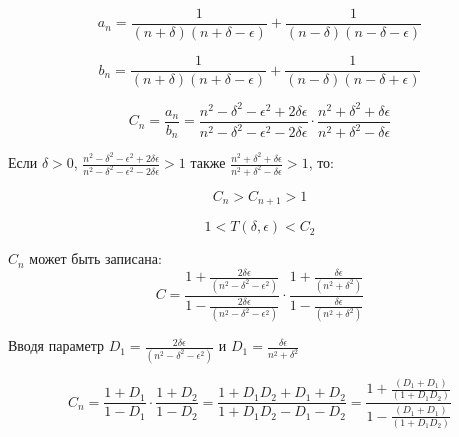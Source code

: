 \begin{equation}
\label{eq:equation103}
a_{n} = \frac{1}{(n + \delta)(n + \delta - \epsilon)} + \frac{1}{(n - \delta)(n - \delta - \epsilon)} 
\end{equation}

\begin{equation}
\label{eq:equation104}
b_{n} = \frac{1}{(n + \delta)(n + \delta - \epsilon)} + \frac{1}{(n - \delta)(n - \delta + \epsilon)} 
\end{equation}

\begin{equation}
\label{eq:equation105}
C_{n} = \frac{a_{n}}{b_{n}} = \frac{n^2 -\delta^2 - \epsilon^2 + 2\delta \epsilon}{n^2 -\delta^2 - \epsilon^2 - 2\delta \epsilon} \cdot \frac{n^2 + \delta^2 + \delta \epsilon}{n^2 + \delta^2 - \delta \epsilon}
\end{equation}

Если $\delta > 0$, $\frac{n^2 - \delta^2 - \epsilon^2 +2\delta \epsilon}{n^2 - \delta^2 - \epsilon^2 - 2\delta \epsilon} > 1$ также $\frac{n^2 + \delta^2 + \delta \epsilon}{n^2 + \delta^2 - \delta \epsilon} > 1$, то:

\begin{equation}
\label{eq:equation106}
C_{n} > C_{n + 1} > 1 
\end{equation}

\begin{equation}
\label{eq:equation107}
1 < T(\delta, \epsilon) < C_{2}
\end{equation} 

$C_{n}$ может быть записана:
\begin{equation}
\label{eq:equation108}
C = \frac{1 + \frac{2 \delta \epsilon}{(n^2 - \delta^2 - \epsilon^2)}}{1 - \frac{2 \delta \epsilon}{(n^2 - \delta^2 - \epsilon^2)}} \cdot \frac{1 + \frac{\delta \epsilon}{(n^2 + \delta^2)}}{1 - \frac{\delta \epsilon}{(n^2 + \delta^2)}}
\end{equation} 

Вводя параметр $D_{1} =  \frac{2 \delta \epsilon}{(n^2 - \delta^2 - \epsilon^2)}$ и $D_{1} =  \frac{\delta \epsilon}{n^2 + \delta^2}$

\begin{equation}
\label{eq:equation109}
C_{n} = \frac{1 + D_{1}}{1 - D_{1}} \cdot  \frac{1 + D_{2}}{1 - D_{2}} = \frac{1 + D_{1}D_{2} + D_{1} + D_{2}}{1 + D_{1}D_{2} - D_{1} - D_{2}} = \frac{1 + \frac{(D_{1} + D_{1})}{(1 + D_{1}D_{2})}}{1 - \frac{(D_{1} + D_{1})}{(1 + D_{1}D_{2})}}
\end{equation} 

